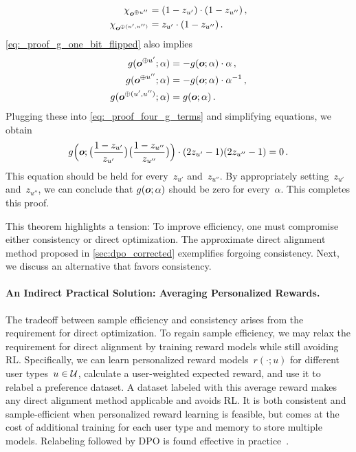 \begin{proofEnd}
\begin{proofEnd}
\begin{align*}
            \chi_{{\bm{o}}^{\oplus u''}} &= (1 - z_{u'}) \cdot (1 - z_{u''}) \,, \\
            \chi_{{\bm{o}}^{\oplus (u', u'')}} &= z_{u'} \cdot (1 - z_{u''}) \,.
        \end{align*}
        \cref{eq:_proof_g_one_bit_flipped} also implies
        \begin{align*}
            g({\bm{o}}^{\oplus u'}; \alpha) &= -g({\bm{o}}; \alpha) \cdot \alpha \,, \\
            g({\bm{o}}^{\oplus u''}; \alpha) &= -g({\bm{o}}; \alpha) \cdot \alpha^{-1} \,, \\
            g({\bm{o}}^{\oplus (u', u'')}; \alpha) &= g({\bm{o}}; \alpha) \,.
        \end{align*}
        Plugging these into \cref{eq:_proof_four_g_terms} and simplifying equations, we obtain
        \begin{equation*}
            g\Big({\bm{o}}; \big(\frac{1 - z_{u'}}{z_{u'}}\big) \big(\frac{1 - z_{u''}}{z_{u''}}\big)\Big) \cdot (2 z_{u'} - 1) (2 z_{u''} - 1)
            = 0
            \,.
        \end{equation*}
        This equation should be held for every~$z_{u'}$ and~$z_{u''}$. By appropriately setting~$z_{u'}$ and~$z_{u''}$, we can conclude that $g({\bm{o}}; \alpha)$ should be zero for every~$\alpha$. This completes this proof.
    \end{proofEnd}

\end{proofEnd}
This theorem highlights a tension: To improve efficiency, one must compromise either consistency or direct optimization. 
The approximate direct alignment method proposed in \cref{sec:dpo_corrected} exemplifies forgoing consistency. Next, we discuss an alternative that favors consistency.


\paragraph{An Indirect Practical Solution: Averaging Personalized Rewards.}
The tradeoff between sample efficiency and consistency arises from the requirement for direct optimization. 
To regain sample efficiency, we may relax the requirement for direct alignment by training reward models while still avoiding RL. Specifically, we can learn personalized reward models~$r(\cdot; u)$ for different user types~$u \in {\mathcal{U}}$, calculate a user-weighted expected reward, and use it to relabel a preference dataset.
A dataset labeled with this average reward makes any direct alignment method applicable and avoids RL. It is both consistent and sample-efficient when personalized reward learning is feasible, but comes at the cost of additional training for each user type and memory to store multiple models.
\ifarxiv Relabeling followed by DPO is found effective in practice~\citep{frick2024evaluate}. \fi


